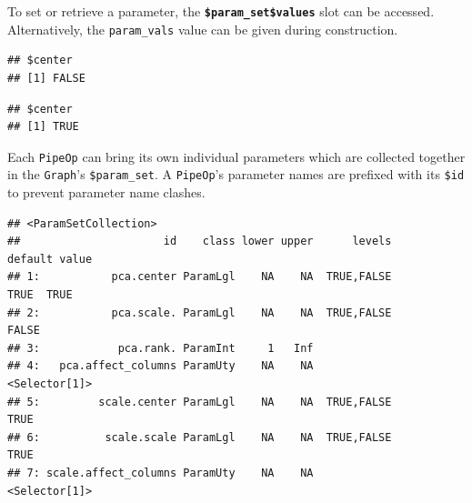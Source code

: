 \documentclass[]{scrbook}
\newenvironment{Shaded}{\begin{snugshade}}{\end{snugshade}}
\newcommand{\DataTypeTok}[1]{\textcolor[rgb]{0.13,0.29,0.53}{#1}}
\newcommand{\KeywordTok}[1]{\textcolor[rgb]{0.13,0.29,0.53}{\textbf{#1}}}
\newcommand{\NormalTok}[1]{#1}
\newcommand{\OperatorTok}[1]{\textcolor[rgb]{0.81,0.36,0.00}{\textbf{#1}}}
\newcommand{\OtherTok}[1]{\textcolor[rgb]{0.56,0.35,0.01}{#1}}
\newcommand{\StringTok}[1]{\textcolor[rgb]{0.31,0.60,0.02}{#1}}
\renewenvironment{Shaded} {\begin{snugshade}\small} {\end{snugshade}}
\begin{document}
To set or retrieve a parameter, the \textbf{\texttt{\$param\_set\$values}} slot can be accessed.
Alternatively, the \texttt{param\_vals} value can be given during construction.

\begin{Shaded}
\end{Shaded}

\begin{verbatim}
## $center
## [1] FALSE
\end{verbatim}

\begin{Shaded}
\end{Shaded}

\begin{verbatim}
## $center
## [1] TRUE
\end{verbatim}

Each \texttt{PipeOp} can bring its own individual parameters which are collected together in the \texttt{Graph}'s \texttt{\$param\_set}.
A \texttt{PipeOp}'s parameter names are prefixed with its \texttt{\$id} to prevent parameter name clashes.

\begin{Shaded}
\end{Shaded}

\begin{verbatim}
## <ParamSetCollection>
##                      id    class lower upper      levels       default value
## 1:           pca.center ParamLgl    NA    NA  TRUE,FALSE          TRUE  TRUE
## 2:           pca.scale. ParamLgl    NA    NA  TRUE,FALSE         FALSE      
## 3:            pca.rank. ParamInt     1   Inf                                
## 4:   pca.affect_columns ParamUty    NA    NA             <Selector[1]>      
## 5:         scale.center ParamLgl    NA    NA  TRUE,FALSE          TRUE      
## 6:          scale.scale ParamLgl    NA    NA  TRUE,FALSE          TRUE      
## 7: scale.affect_columns ParamUty    NA    NA             <Selector[1]>
\end{verbatim}
\end{document}
